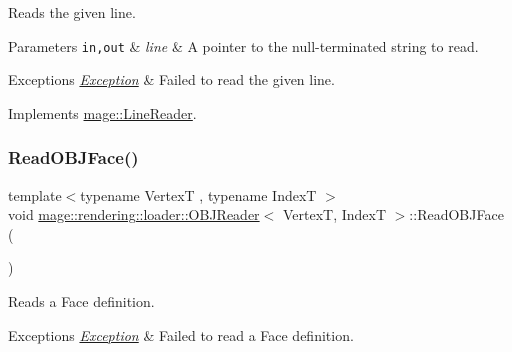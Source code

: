 Reads the given line.


\begin{DoxyParams}[1]{Parameters}
\mbox{\tt in,out}  & {\em line} & A pointer to the null-\/terminated string to read. \\
\hline
\end{DoxyParams}

\begin{DoxyExceptions}{Exceptions}
{\em \hyperlink{classmage_1_1_exception}{Exception}} & Failed to read the given line. \\
\hline
\end{DoxyExceptions}


Implements \hyperlink{classmage_1_1_line_reader_ae50ac0637eddead37a7a9cca2a570072}{mage\+::\+Line\+Reader}.

\hypertarget{classmage_1_1rendering_1_1loader_1_1_o_b_j_reader_a58d5c4e4a5a82714567413b6e17a9ec7}{}\label{classmage_1_1rendering_1_1loader_1_1_o_b_j_reader_a58d5c4e4a5a82714567413b6e17a9ec7} 
\subsubsection{\texorpdfstring{Read\+O\+B\+J\+Face()}{ReadOBJFace()}}
{\footnotesize\ttfamily template$<$typename VertexT , typename IndexT $>$ \\
void \hyperlink{classmage_1_1rendering_1_1loader_1_1_o_b_j_reader}{mage\+::rendering\+::loader\+::\+O\+B\+J\+Reader}$<$ VertexT, IndexT $>$\+::Read\+O\+B\+J\+Face (\begin{DoxyParamCaption}{ }\end{DoxyParamCaption})\hspace{0.3cm}{\ttfamily [private]}}

Reads a Face definition.


\begin{DoxyExceptions}{Exceptions}
{\em \hyperlink{classmage_1_1_exception}{Exception}} & Failed to read a Face definition. \\
\hline
\end{DoxyExceptions}
\hypertarget{classmage_1_1rendering_1_1loader_1_1_o_b_j_reader_a4e733a0afea4b82e3aea89fe58f5bfba}{}\label{classmage_1_1rendering_1_1loader_1_1_o_b_j_reader_a4e733a0afea4b82e3aea89fe58f5bfba} 
